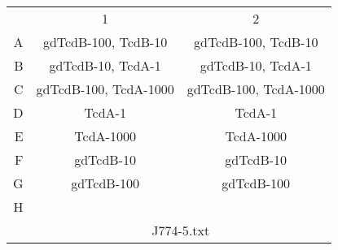 \begin{adjustwidth}{0in}{3in}
{{\begin{tabular}{r|c|c|}
  \multicolumn{1}{c}{\multirow{ 1 }{*}{  }} & \multicolumn{1}{c}{1} & \multicolumn{1}{c}{2} \\ 
  \cline{2-3}\multirow{ 1 }{*}{ A } & gdTcdB-100, TcdB-10 & gdTcdB-100, TcdB-10 \\ 
  \cline{2-3}\multirow{ 1 }{*}{ B } & gdTcdB-10, TcdA-1 & gdTcdB-10, TcdA-1 \\ 
  \cline{2-3}\multirow{ 1 }{*}{ C } & gdTcdB-100, TcdA-1000 & gdTcdB-100, TcdA-1000 \\ 
  \cline{2-3}\multirow{ 1 }{*}{ D } & TcdA-1 & TcdA-1 \\ 
  \cline{2-3}\multirow{ 1 }{*}{ E } & TcdA-1000 & TcdA-1000 \\ 
  \cline{2-3}\multirow{ 1 }{*}{ F } & gdTcdB-10 & gdTcdB-10 \\ 
  \cline{2-3}\multirow{ 1 }{*}{ G } & gdTcdB-100 & gdTcdB-100 \\ 
  \cline{2-3}\multirow{ 1 }{*}{ H } &  &  \\ 
   \cline{2-3} \multicolumn{1}{c}{} & \multicolumn{2}{c}{J774-5.txt}\end{tabular}
}
}
\end{adjustwidth}
